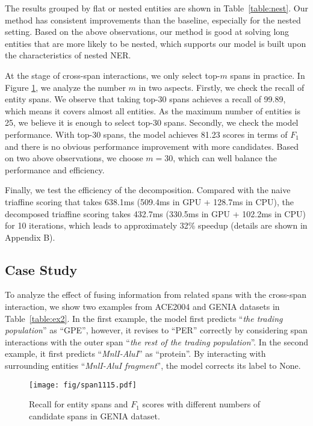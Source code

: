 \documentclass[11pt]{article}
\begin{document}
The results grouped by flat or nested entities are shown in Table~\ref{table:nest}. Our method has consistent improvements than the baseline, especially for the nested setting. Based on the above observations, our method is good at solving long entities that are more likely to be nested, which supports our model is built upon the characteristics of nested NER.

At the stage of cross-span interactions, we only select top-$m$ spans in practice. In Figure \ref{ablation:genia span}, we analyze the number $m$ in two aspects. Firstly, we check the recall of entity spans.
We observe that taking top-30 spans achieves a recall of 99.89, which means it covers almost all entities. As the maximum number of entities is 25, we believe it is enough to select top-30 spans. Secondly, we check the model performance. With top-30 spans, the model achieves 81.23 scores in terms of $F_1$ and there is no obvious performance improvement with more candidates. Based on two above observations, we choose $m=30$, which can well balance the performance and efficiency.





Finally, we test the efficiency of the decomposition. 
Compared with the naive triaffine scoring that takes 638.1ms (509.4ms in GPU + 128.7ms in CPU), the decomposed triaffine scoring takes 432.7ms (330.5ms in GPU + 102.2ms in CPU) for 10 iterations, which leads to approximately 32\% speedup (details are shown in Appendix B).



\subsection{Case Study}


To analyze the effect of fusing information from related spans with the cross-span interaction, we show two examples from ACE2004 and GENIA datasets in Table~\ref{table:ex2}.
In the first example, the model first predicts ``\textit{the trading population}'' as ``GPE'', however, it revises to ``PER'' correctly by considering span interactions with the outer span ``\textit{the rest of the trading population}''.
In the second example, it first predicts ``\textit{MnlI-AluI}'' as ``protein''. By interacting with surrounding entities ``\textit{MnlI-AluI fragment}'', the model corrects its label to None. 

\begin{figure}[t]
\centering
\texttt{[image: fig/span1115.pdf]}
\caption{Recall for entity spans and $F_1$ scores with different numbers of candidate spans in GENIA dataset.}
\label{ablation:genia span}
\end{figure}
\end{document}
